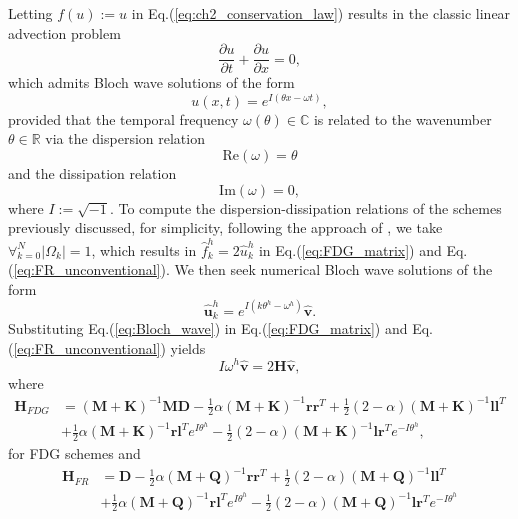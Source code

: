 \documentclass[preprint,12pt]{elsarticle}
\begin{document}
Letting $f(u) := u$ in Eq.(\ref{eq:ch2_conservation_law}) results in the classic linear advection problem
\begin{equation}
    \frac{\partial u}{\partial t} + \frac{\partial u}{\partial x} = 0,
\end{equation}
which admits Bloch wave solutions of the form
\begin{equation}
    u(x,t) = e^{I(\theta x - \omega t)},
\end{equation}
provided that the temporal frequency $\omega(\theta) \in \mathbb{C}$ is related to the wavenumber $\theta \in \mathbb{R}$ via the dispersion relation
\begin{equation}
    \text{Re}(\omega) = \theta
\end{equation}
and the dissipation relation
\begin{equation}
    \text{Im}(\omega) = 0,
\end{equation}
where $I := \sqrt{-1}$. To compute the dispersion-dissipation relations of the schemes previously discussed, for simplicity, following the approach of \cite{vincent2011new}, we take $\forall_{k=0}^{N} |\Omega_k| = 1$, which results in $\hat{f}_k^h = 2\hat{u}^h_k$ in Eq.(\ref{eq:FDG_matrix}) and Eq.(\ref{eq:FR_unconventional}). We then seek numerical Bloch wave solutions of the form
\begin{equation}
    \hat{\mathbf{u}}^h_k = e^{I(k\theta^h-\omega^h)} \hat{\mathbf{v}}.
    \label{eq:Bloch_wave}
\end{equation}
Substituting Eq.(\ref{eq:Bloch_wave}) in Eq.(\ref{eq:FDG_matrix}) and Eq.(\ref{eq:FR_unconventional}) yields
\begin{equation}
    I\omega^h \hat{\mathbf{v}} = 2\mathbf{H} \hat{\mathbf{v}},
    \label{eq:eig}
\end{equation}
where
\begin{align}
    \mathbf{H}_{FDG} &=
    (\mathbf{M}+\mathbf{K})^{-1}\mathbf{M}\mathbf{D}
    - \frac{1}{2}\alpha (\mathbf{M}+\mathbf{K})^{-1}\mathbf{r}\mathbf{r}^T
    + \frac{1}{2}(2-\alpha) (\mathbf{M}+\mathbf{K})^{-1} \mathbf{l}\mathbf{l}^T \nonumber \\
    &+ \frac{1}{2}\alpha (\mathbf{M}+\mathbf{K})^{-1} \mathbf{r} \mathbf{l}^T e^{I\theta^h}
    -\frac{1}{2}(2-\alpha) (\mathbf{M}+\mathbf{K})^{-1} \mathbf{l} \mathbf{r}^T  e^{-I\theta^h},
    \label{eq:ch3_Q_FDG}
\end{align}
for FDG schemes and
\begin{align}
    \mathbf{H}_{FR}
    &=
    \mathbf{D}
    -\frac{1}{2}\alpha (\mathbf{M} + \mathbf{Q})^{-1} \mathbf{r} \mathbf{r}^T
    + \frac{1}{2}(2-\alpha) (\mathbf{M} + \mathbf{Q})^{-1} \mathbf{l} \mathbf{l}^T \nonumber \\
    &+\frac{1}{2}\alpha (\mathbf{M} + \mathbf{Q})^{-1} \mathbf{r} \mathbf{l}^T e^{I\theta^h}
    - \frac{1}{2}(2-\alpha) (\mathbf{M} + \mathbf{Q})^{-1} \mathbf{l} \mathbf{r}^{T} e^{-I\theta^h}
    \label{eq:ch3_Q_FR}
\end{align}
\end{document}

